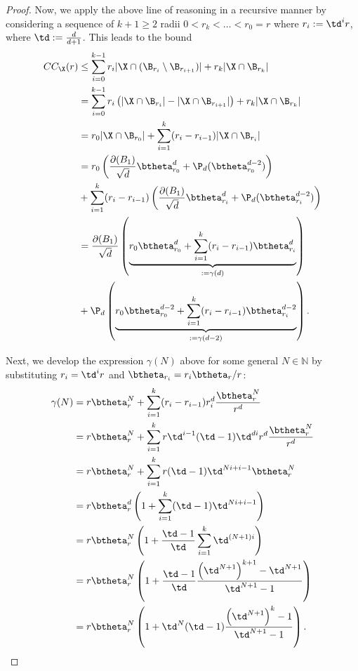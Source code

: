 \begin{proof}
Now, we apply the above line of reasoning in a recursive manner by considering a sequence of $k+1\geq 2$ radii ${0<r_k<\ldots<r_0=r}$ where $r_i:=\td^i r$, where $\td:=\frac{d}{d+1}$. This leads to the bound
\begin{align}
\label{eq:cc_eval}
CC_\X(r)&\leq \sum_{i=0}^{k-1}r_i |\X\cap (\B_{r_i}\setminus \B_{r_{i+1}})| + r_k|\X\cap \B_{r_k}|\nonumber\\
  &= \sum_{i=0}^{k-1}r_i\left(|\X\cap \B_{r_i}|- |\X\cap \B_{r_{i+1}}|\right)+ r_k|\X\cap \B_{r_k}| \nonumber\\
  &= r_0|\X\cap \B_{r_0}| + \sum_{i=1}^{k}(r_i - r_{i-1})|\X\cap \B_{r_i}| \nonumber\\
  & =r_0\left(\frac{\partial(B_1)}{\sqrt{d}}\btheta^d_{r_0} +\P_d(\btheta^{d-2}_{r_0})\right) \nonumber\\&+ \sum_{i=1}^{k}(r_i - r_{i-1}) \left(\frac{\partial(B_1)}{\sqrt{d}}\btheta^d_{r_i} +\P_d(\btheta^{d-2}_{r_i})\right) \nonumber\\
  &= \frac{\partial(B_1)}{\sqrt{d}} \left(\underbrace{r_0 \btheta^d_{r_0} + \sum_{i=1}^k(r_i-r_{i-1}) \btheta^d_{r_i}}_{:=\gamma(d)}\right) \nonumber\\&+ \P_d\left(\underbrace{r_0\btheta^{d-2}_{r_0} + \sum_{i=1}^{k}(r_i - r_{i-1}) \btheta^{d-2}_{r_i}}_{:=\gamma(d-2)}\right).
\end{align}

Next, we develop the expression $\gamma(N)$ above for some general $N\in\mathbb{N}$ by substituting $r_i=\td^i r$ and $\btheta_{r_i}= r_i\btheta_{r}/r$: 
\begin{align}
  \gamma(N) &=r \btheta^N_{r} + \sum_{i=1}^k(r_i-r_{i-1}) r_i^d\frac{\btheta^N_{r}}{r^d} \nonumber\\
  & = r \btheta^N_{r} + \sum_{i=1}^kr\td^{i-1}(\td-1) \td^{di} r^d\frac{\btheta^N_{r}}{r^d} \nonumber\\ 
  &=  r \btheta^N_{r} + \sum_{i=1}^kr (\td-1) \td^{Ni+ i -1} \btheta^N_{r} \nonumber\\ 
  &=   r \btheta^d_{r} \left(1 + \sum_{i=1}^k (\td-1) \td^{Ni+ i -1} \right)\nonumber\\
  &= r \btheta^N_{r} \left(1 + \frac{\td-1}{\td}\sum_{i=1}^k \td^{(N+1)i} \right)\nonumber\\
  &= r \btheta^N_{r} \left(1 + \frac{\td-1}{\td}\frac{\left(\td^{N+1}\right)^{k+1} - \td^{N+1}}{\td^{N+1} - 1} \right)\nonumber\\
  &= r \btheta^N_{r} \left(1 + \td^N(\td-1)\frac{\left(\td^{N+1}\right)^k - 1}{\td^{N+1} - 1} \right).\nonumber\\
\end{align}


\end{proof}
